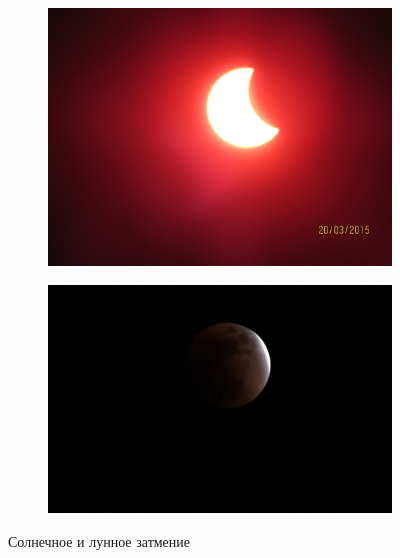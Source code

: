 \documentclass{article}
\begin{document}
    \begin{figure}[p] 
    \centering 
    \begin{subfigure}[b]{0.43\textwidth} 
    	\includegraphics[width = \textwidth]{img/1} 
    	\caption{} 
    \end{subfigure} 
    \begin{subfigure}[b]{0.48\textwidth} 
    	\includegraphics[width = \textwidth]{img/6} 
    	\caption{} 
    \end{subfigure} 
    \caption{Солнечное и лунное затмение} 
    \end{figure}
    
\end{document}
